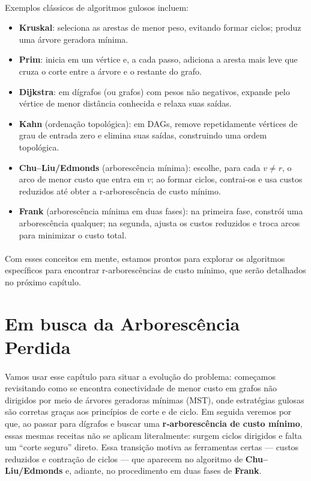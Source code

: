 \documentclass[12pt,a4paper]{article}
\def\emph#1{#1}%
\begin{document}
\paragraph{}
Exemplos clássicos de algoritmos gulosos incluem:

\begin{itemize}
        \item \textbf{Kruskal}: seleciona as arestas de menor peso, evitando formar ciclos; produz uma árvore geradora mínima.
        \item \textbf{Prim}: inicia em um vértice e, a cada passo, adiciona a aresta mais leve que cruza o corte entre a árvore e o restante do grafo.
        \item \textbf{Dijkstra}: em dígrafos (ou grafos) com pesos não negativos, expande pelo vértice de menor distância conhecida e relaxa suas saídas.
        \item  \textbf{Kahn} (ordenação topológica): em DAGs, remove repetidamente vértices de grau de entrada zero e elimina suas saídas, construindo uma ordem topológica.
        \item \textbf{Chu–Liu/Edmonds} (arborescência mínima): escolhe, para cada \(v\neq r\), o arco de menor custo que entra em \(v\); ao formar ciclos, contrai-os e usa custos reduzidos até obter a r‑arborescência de custo mínimo.
       \item \textbf{Frank} (arborescência mínima em duas fases): na primeira fase, constrói uma arborescência qualquer; na segunda, ajusta os custos reduzidos e troca arcos para minimizar o custo total.
\end{itemize}

\paragraph{}
Com esses conceitos em mente, estamos prontos para explorar os algoritmos específicos para encontrar r-arborescências de custo mínimo, que serão detalhados no próximo capítulo.

\section{Em busca da Arborescência Perdida}

\paragraph{}
Vamos usar esse capítulo para situar a evolução do problema: começamos revisitando como se encontra conectividade de menor custo em grafos não dirigidos por meio de \emph{árvores geradoras mínimas} (MST), onde estratégias gulosas são corretas graças aos princípios de \emph{corte} e de \emph{ciclo}. Em seguida veremos por que, ao passar para \emph{dígrafos} e buscar uma \textbf{r‑arborescência de custo mínimo}, essas mesmas receitas não se aplicam literalmente: surgem ciclos dirigidos e falta um “corte seguro” direto. Essa transição motiva as ferramentas certas — \emph{custos reduzidos} e \emph{contração de ciclos} — que aparecem no algoritmo de \textbf{Chu–Liu/Edmonds} e, adiante, no procedimento em duas fases de \textbf{Frank}.
\end{document}
